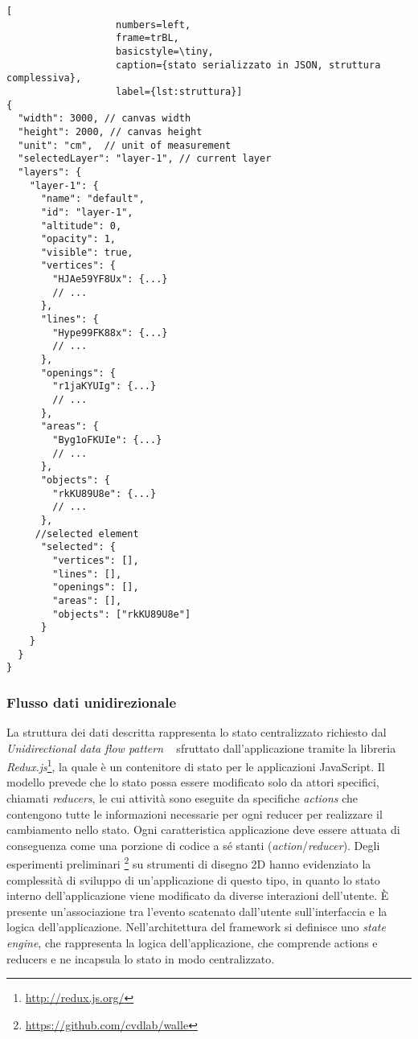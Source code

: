 \begin{lstlisting}[
                   numbers=left,
                   frame=trBL,
                   basicstyle=\tiny,
                   caption={stato serializzato in JSON, struttura complessiva},
                   label={lst:struttura}]
{
  "width": 3000, // canvas width
  "height": 2000, // canvas height
  "unit": "cm",  // unit of measurement
  "selectedLayer": "layer-1", // current layer
  "layers": {
    "layer-1": {
      "name": "default",
      "id": "layer-1",
      "altitude": 0,
      "opacity": 1,
      "visible": true,
      "vertices": {
        "HJAe59YF8Ux": {...}
        // ...
      },
      "lines": {
        "Hype99FK88x": {...}
        // ...
      },
      "openings": {
        "r1jaKYUIg": {...}
        // ...
      },
      "areas": {
        "Byg1oFKUIe": {...}
        // ...
      },
      "objects": {
        "rkKU89U8e": {...}
        // ...
      },
     //selected element
      "selected": {
        "vertices": [],
        "lines": [],
        "openings": [],
        "areas": [],
        "objects": ["rkKU89U8e"]
      }
    }
  }
}
\end{lstlisting}
\newpage

\subsubsection*{Flusso dati unidirezionale}
\noindent
La struttura dei dati descritta rappresenta lo stato centralizzato richiesto dal \emph{Unidirectional data flow pattern}
~\cite{uniflow} sfruttato dall'applicazione tramite la libreria \emph{Redux.js}\footnote{\url{http://redux.js.org/}},
la quale è un contenitore di stato per le applicazioni JavaScript.
Il modello prevede che lo stato possa essere modificato solo da attori specifici, chiamati \emph{reducers},
le cui attività sono eseguite da specifiche \emph{actions} che contengono tutte le informazioni necessarie per
ogni reducer per realizzare il cambiamento nello stato. Ogni caratteristica applicazione deve essere attuata di conseguenza
come una porzione di codice a sé stanti (\emph{action}/\emph{reducer}).
Degli esperimenti preliminari \footnote{\url{https://github.com/cvdlab/walle}} su strumenti di disegno 2D
hanno evidenziato la complessità di sviluppo di un'applicazione di questo tipo, in quanto
lo stato interno dell'applicazione viene modificato da diverse interazioni dell'utente.
\`E presente un'associazione tra l'evento scatenato dall'utente sull'interfaccia e la logica dell'applicazione.
Nell'architettura del framework si definisce uno \emph{state engine}, che rappresenta la logica dell'applicazione,
che comprende actions e reducers e ne incapsula lo stato in modo centralizzato.
\newpage

